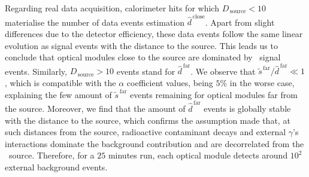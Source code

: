 Regarding real data acquisition, calorimeter hits for which $D_{\,\text{source}}<10$ materialise the number of data events estimation $\hat{d}^{\,\text{close}}$.
Apart from slight differences due to the detector efficiency, these data events follow the same linear evolution as signal events with the distance to the source.
This leads us to conclude that optical modules close to the source are dominated by \Co\ signal events.
Similarly, $D_{\,\text{source}}>10$ events stand for $\hat{d}^{\,\text{far}}$.
We observe that $\tilde{s}^{\,\text{far}}/\hat{d}^{\,\text{far}} \ll 1$, which is compatible with the $\alpha$ coefficient values, being $5\%$ in the worse case, explaining the few amount of $\tilde{s}^{\,\text{far}}$ events remaining for optical modules far from the source.
Moreover, we find that the amount of $\hat{d}^{\,\text{far}}$ events is globally stable with the distance to the source, which confirms the assumption made that, at such distances from the source, radioactive contaminant decays and external $\gamma$'s interactions dominate the background contribution and are decorrelated from the \Co\ source.
Therefore, for a $25$ minutes run, each optical module detects around $10^{2}$ external background events.

